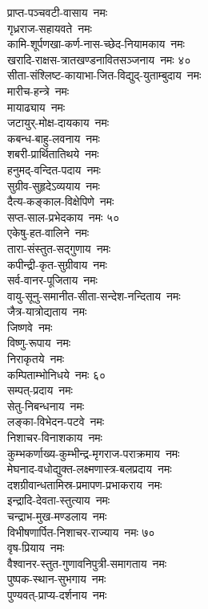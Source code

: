 \begin{multicols}{2}
\begin{flushleft}
प्राप्त-पञ्चवटी-वासाय~नमः\\
गृध्रराज-सहायवते~नमः\\
कामि-शूर्पणखा-कर्ण-नास-च्छेद-नियामकाय~नमः\\
खरादि-राक्षस-त्रातखण्डनावितसञ्जनाय~नमः \hfill ४०\\
सीता-संश्लिष्ट-कायाभा-जित-विद्युद्-युताम्बुदाय~नमः\\
मारीच-हन्त्रे~नमः\\
मायाढ्याय~नमः\\
जटायुर्-मोक्ष-दायकाय~नमः\\
कबन्ध-बाहु-लवनाय~नमः\\
शबरी-प्रार्थितातिथये~नमः\\
हनुमद्-वन्दित-पदाय~नमः\\
सुग्रीव-सुहृदेऽव्ययाय~नमः\\
दैत्य-कङ्काल-विक्षेपिणे~नमः\\
सप्त-साल-प्रभेदकाय~नमः \hfill ५०\\
एकेषु-हत-वालिने~नमः\\
तारा-संस्तुत-सद्गुणाय~नमः\\
कपीन्द्री-कृत-सुग्रीवाय~नमः\\
सर्व-वानर-पूजिताय~नमः\\
वायु-सूनु-समानीत-सीता-सन्देश-नन्दिताय~नमः\\
जैत्र-यात्रोद्यताय~नमः\\
जिष्णवे~नमः\\
विष्णु-रूपाय~नमः\\
निराकृतये~नमः\\
कम्पिताम्भोनिधये~नमः \hfill ६०\\
सम्पत्-प्रदाय~नमः\\
सेतु-निबन्धनाय~नमः\\
लङ्का-विभेदन-पटवे~नमः\\
निशाचर-विनाशकाय~नमः\\
कुम्भकर्णाख्य-कुम्भीन्द्र-मृगराज-पराक्रमाय~नमः\\
मेघनाद-वधोद्युक्त-लक्ष्मणास्त्र-बलप्रदाय~नमः\\
दशग्रीवान्धतामिस्र-प्रमापण-प्रभाकराय~नमः\\
इन्द्रादि-देवता-स्तुत्याय~नमः\\
चन्द्राभ-मुख-मण्डलाय~नमः\\
विभीषणार्पित-निशाचर-राज्याय~नमः \hfill ७०\\
वृष-प्रियाय~नमः \\
वैश्वानर-स्तुत-गुणावनिपुत्री-समागताय~नमः\\
पुष्पक-स्थान-सुभगाय~नमः\\
पुण्यवत्-प्राप्य-दर्शनाय~नमः\\

\end{flushleft}
\end{multicols}
